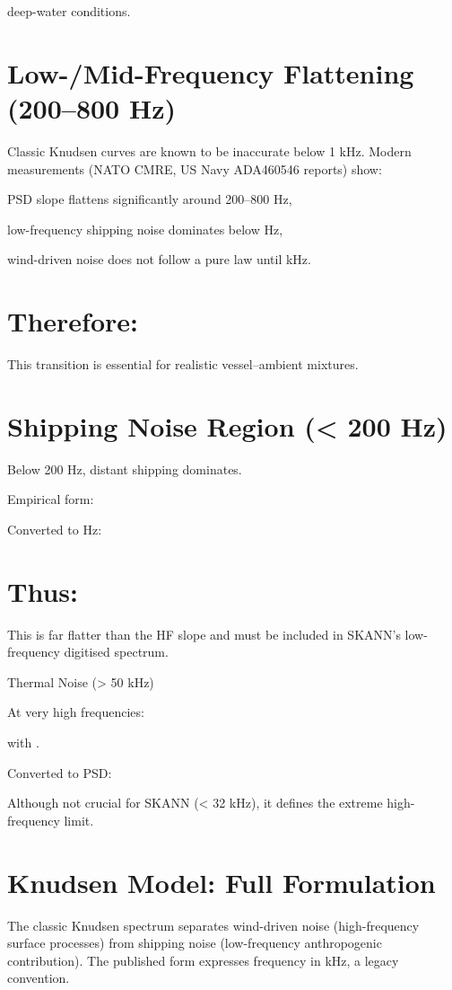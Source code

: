 \documentclass[12pt]{article}
\begin{document}
deep-water conditions.

\section*{Low-/Mid-Frequency Flattening (200–800 Hz)}
Classic Knudsen curves are known to be inaccurate below 1 kHz. Modern measurements (NATO CMRE, US Navy ADA460546 reports) show:

PSD slope flattens significantly around 200–800 Hz,

low-frequency shipping noise dominates below  Hz,

wind-driven noise does not follow a pure  law until  kHz.

\section*{Therefore:}

This transition is essential for realistic vessel–ambient mixtures.

\section*{Shipping Noise Region (< 200 Hz)}
Below 200 Hz, distant shipping dominates.

Empirical form:


Converted to Hz:


\section*{Thus:}

This is far flatter than the HF slope and must be included in SKANN’s low-frequency digitised spectrum.

Thermal Noise (> 50 kHz)

At very high frequencies:


with .

Converted to PSD:


Although not crucial for SKANN (< 32 kHz), it defines the extreme high-frequency limit.

\section*{Knudsen Model: Full Formulation}
The classic Knudsen spectrum separates wind-driven noise (high-frequency surface processes) from shipping noise (low-frequency anthropogenic contribution). The published form expresses frequency in kHz, a legacy convention.
\end{document}
